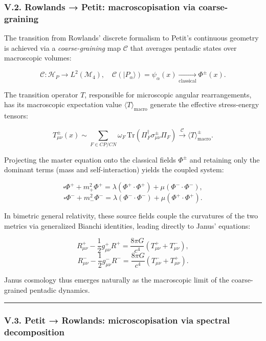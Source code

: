 \documentclass[11pt]{article}
\let\oldmathcal\mathcal
\renewcommand{\mathcal}[1]{\oldmathcal{#1}}
\let\Box\square
\providecommand{\Box}{\square}
\begin{document}
\hypertarget{v.2.-rowlands-petit-macroscopisation-via-coarse-graining}{%
\subsubsection{V.2. Rowlands → Petit: macroscopisation via
coarse-graining}\label{v.2.-rowlands-petit-macroscopisation-via-coarse-graining}}

The transition from Rowlands' discrete formalism to Petit's continuous
geometry is achieved via a \emph{coarse-graining} map \(\mathcal{C}\)
that averages pentadic states over macroscopic volumes:

\[
\mathcal{C} : \mathcal{H}_P \to L^2(\mathcal{M}_4), \quad \mathcal{C}(|P_\alpha\rangle) = \psi_\alpha(x) \xrightarrow[\text{classical}]{} \Phi^\pm(x).
\]

The transition operator \(T\), responsible for microscopic angular
rearrangements, has its macroscopic expectation value
\(\langle T \rangle_{\text{macro}}\) generate the effective
stress-energy tensors:

\[
T_{\mu\nu}^\pm(x) \sim \sum_{F \in CP/CN} \omega_F \, \text{Tr}\!\left( \Pi_F^\dagger \sigma_{\mu\nu}^\pm \Pi_F \right) \xrightarrow{\mathcal{C}} \langle T \rangle_{\text{macro}}^\pm.
\]

Projecting the master equation onto the classical fields \(\Phi^\pm\)
and retaining only the dominant terms (mass and self-interaction) yields
the coupled system:

\[
\Box \Phi^+ + m_+^2 \Phi^+ = \lambda (\Phi^+ \cdot \Phi^+) + \mu (\Phi^- \cdot \Phi^-),
\] \[
\Box \Phi^- + m_-^2 \Phi^- = \lambda (\Phi^- \cdot \Phi^-) + \mu (\Phi^+ \cdot \Phi^+).
\]

In bimetric general relativity, these source fields couple the
curvatures of the two metrics via generalized Bianchi identities,
leading directly to Janus' equations:

\[
R_{\mu\nu}^+ - \frac{1}{2}g_{\mu\nu}^+ R^+ = \frac{8\pi G}{c^4}\left( T_{\mu\nu}^+ + T_{\mu\nu}^- \right),
\] \[
R_{\mu\nu}^- - \frac{1}{2}g_{\mu\nu}^- R^- = \frac{8\pi G}{c^4}\left( T_{\mu\nu}^- + T_{\mu\nu}^+ \right).
\]

Janus cosmology thus emerges naturally as the macroscopic limit of the
coarse-grained pentadic dynamics.

\begin{center}\rule{0.5\linewidth}{0.5pt}\end{center}

\hypertarget{v.3.-petit-rowlands-microscopisation-via-spectral-decomposition}{%
\subsubsection{V.3. Petit → Rowlands: microscopisation via spectral
decomposition}\label{v.3.-petit-rowlands-microscopisation-via-spectral-decomposition}}
\end{document}
